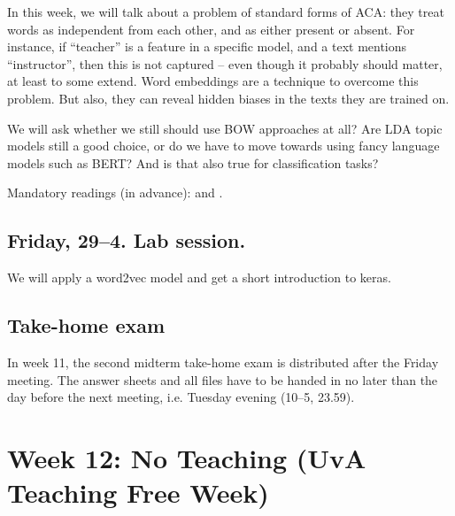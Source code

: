 In this week, we will talk about a problem of standard forms of ACA: they treat words as independent from each other, and as either present or absent. For instance, if ``teacher'' is a feature in a specific model, and a text mentions ``instructor'', then this is not captured -- even though it probably should matter, at least to some extend. Word embeddings are a technique to overcome this problem. But also, they can reveal hidden biases in the texts they are trained on.

We will ask whether we still should use BOW approaches at all? Are LDA topic models still a good choice, or do we have to move towards using fancy language models such as BERT? And is that also true for classification tasks?






Mandatory readings (in advance): \cite{Kusner2015} and \cite{Garg2017}.


\subsection*{Friday, 29--4. Lab session.}
We will apply a word2vec model and get a short introduction to keras.




\subsection*{Take-home exam}
In week 11, the second midterm take-home exam is distributed after the Friday meeting. The answer sheets and all files have to be handed in no later than the day before the next meeting, i.e. Tuesday evening (10--5, 23.59).





\section*{Week 12: No Teaching (UvA Teaching Free Week)}




